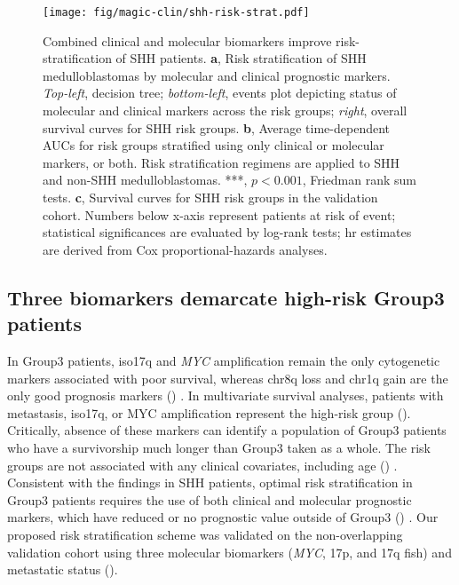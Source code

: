 \clearpage

\begin{figure}[h]
	\begin{center}
		\texttt{[image: fig/magic-clin/shh-risk-strat.pdf]}
	\end{center}
	\caption[Combined clinical and molecular biomarkers improve risk-stratification of SHH patients]
	{
	Combined clinical and molecular biomarkers improve risk-stratification of SHH patients.
	\textbf{a}, Risk stratification of SHH medulloblastomas by molecular and clinical prognostic markers. \emph{Top-left}, decision tree; \emph{bottom-left}, events plot depicting status of molecular and clinical markers across the risk groups; \emph{right}, overall survival curves for SHH risk groups.
	\textbf{b}, Average time-dependent AUCs for risk groups stratified using only clinical or molecular markers, or both. Risk stratification regimens are applied to SHH and non-SHH medulloblastomas. ***, $p < 0.001$, Friedman rank sum tests.
	\textbf{c}, Survival curves for SHH risk groups in the validation cohort.
	Numbers below x-axis represent patients at risk of event; statistical significances are evaluated by log-rank tests; \gls{hr} estimates are derived from Cox proportional-hazards analyses.
	}
	\label{fig:shh-risk-strat}
\end{figure}

\clearpage

\subsection{Three biomarkers demarcate high-risk Group3 patients}

In Group3 patients, iso17q and \emph{MYC} amplification remain the only cytogenetic markers associated with poor survival, whereas chr8q loss and chr1q gain are the only good prognosis markers () . In multivariate survival analyses, patients with metastasis, iso17q, or MYC amplification represent the high-risk group (). Critically, absence of these markers can identify a population of Group3 patients who have a survivorship much longer than Group3 taken as a whole. The risk groups are not associated with any clinical covariates, including age () . Consistent with the findings in SHH patients, optimal risk stratification in Group3 patients requires the use of both clinical and molecular prognostic markers, which have reduced or no prognostic value outside of Group3 () . Our proposed risk stratification scheme was validated on the non-overlapping validation cohort using three molecular biomarkers (\emph{MYC}, 17p, and 17q \gls{fish}) and metastatic status ().

